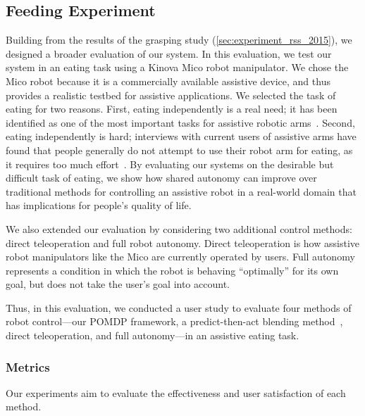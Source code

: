 \subsection{Feeding Experiment}
\label{sec:experiment_hri_2016}

\graphicspath{{./}{./images_hri_2016/}}


Building from the results of the grasping study (\cref{sec:experiment_rss_2015}), we designed a broader evaluation of our system. In this evaluation, we test our system in an eating task using a Kinova Mico robot manipulator. We chose the Mico robot because it is a commercially available assistive device, and thus provides a realistic testbed for assistive applications. We selected the task of eating for two reasons. First, eating independently is a real need; it has been identified as one of the most important tasks for assistive robotic arms~\citep{chung_2013}. Second, eating independently is hard; interviews with current users of assistive arms have found that people generally do not attempt to use their robot arm for eating, as it requires too much effort~\citep{herlant_2016}. By evaluating our systems on the desirable but difficult task of eating, we show how shared autonomy can improve over traditional methods for controlling an assistive robot in a real-world domain that has implications for people's quality of life.

We also extended our evaluation by considering two additional control methods: direct teleoperation and full robot autonomy. Direct teleoperation is how  assistive robot manipulators like the Mico are currently operated by users. Full autonomy represents a condition in which the robot is behaving ``optimally'' for its own goal, but does not take the user's goal into account. 

Thus, in this evaluation, we conducted a user study to evaluate four methods of robot control---our POMDP framework, a predict-then-act blending method~\citep{dragan_2013_assistive}, direct teleoperation, and full autonomy---in an assistive eating task. 

\subsubsection{Metrics}
\label{sec:experiment_hri_2016_metrics}
Our experiments aim to evaluate the effectiveness and user satisfaction of each method. %

